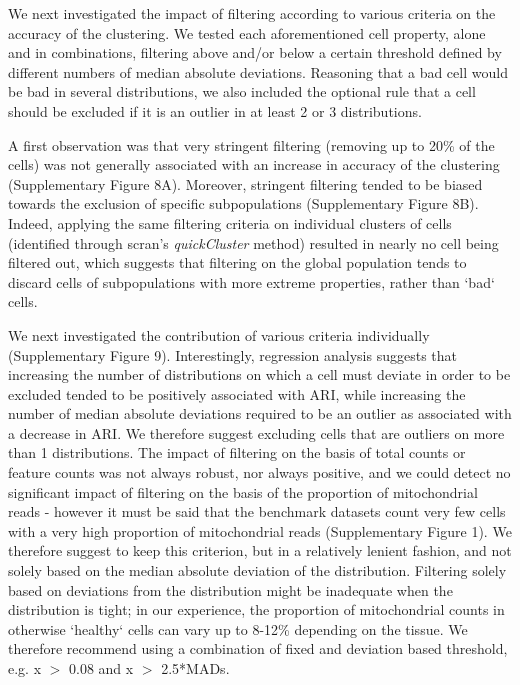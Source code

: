 \documentclass{bmcart}
\begin{document}
We next investigated the impact of filtering according to various criteria on the accuracy of the clustering. We tested each aforementioned cell property, alone and in combinations, filtering above and/or below a certain threshold defined by different numbers of median absolute deviations. Reasoning that a bad cell would be bad in several distributions, we also included the optional rule that a cell should be excluded if it is an outlier in at least 2 or 3 distributions.

A first observation was that very stringent filtering (removing up to 20\% of the cells) was not generally associated with an increase in accuracy of the clustering (Supplementary Figure 8A). Moreover, stringent filtering tended to be biased towards the exclusion of specific subpopulations (Supplementary Figure 8B). Indeed, applying the same filtering criteria on individual clusters of cells (identified through scran's \textit{quickCluster} method) resulted in nearly no cell being filtered out, which suggests that filtering on the global population tends to discard cells of subpopulations with more extreme properties, rather than `bad` cells.

We next investigated the contribution of various criteria individually (Supplementary Figure 9). Interestingly, regression analysis suggests that increasing the number of distributions on which a cell must deviate in order to be excluded tended to be positively associated with ARI, while increasing the number of median absolute deviations required to be an outlier as associated with a decrease in ARI. We therefore suggest excluding cells that are outliers on more than 1 distributions. The impact of filtering on the basis of total counts or feature counts was not always robust, nor always positive, and we could detect no significant impact of filtering on the basis of the proportion of mitochondrial reads - however it must be said that the benchmark datasets count very few cells with a very high proportion of mitochondrial reads (Supplementary Figure 1). We therefore suggest to keep this criterion, but in a relatively lenient fashion, and not solely based on the median absolute deviation of the distribution. Filtering solely based on deviations from the distribution might be inadequate when the distribution is tight; in our experience, the proportion of mitochondrial counts in otherwise `healthy` cells can vary up to 8-12\% depending on the tissue. We therefore recommend using a combination of fixed and deviation based threshold, e.g. x $>$ 0.08 and x $>$ 2.5*MADs.
\end{document}
